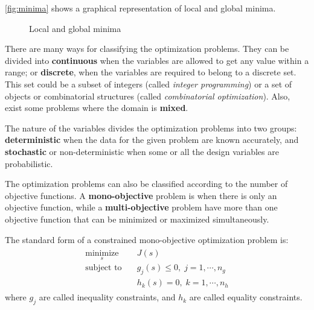 \autoref{fig:minima} shows a graphical representation of local and global minima.

\begin{figure}[H]
\caption{Local and global minima}
\label{fig:minima}
\centering
{}
\end{figure}

There are many ways for classifying the optimization problems. They can be divided into \textbf{continuous} when the variables are allowed to get any value within a range; or \textbf{discrete}, when the variables are required to belong to a discrete set. This set could be a subset of integers (called \textit{integer programming}) or a set of objects or combinatorial structures (called \textit{combinatorial optimization}). Also, exist some problems where the domain is \textbf{mixed}.

The nature of the variables divides the optimization problems into two groups: \textbf{deterministic} when the data for the given problem are known accurately, and \textbf{stochastic} or non-deterministic when some or all the design variables are probabilistic.

The optimization problems can also be classified according to the number of objective functions. A \textbf{mono-objective} problem is when there is only an objective function, while a \textbf{multi-objective} problem have more than one objective function that can be minimized or maximized simultaneously.

The standard form of a constrained mono-objective optimization problem is:
%
\begin{align}
\begin{split}
    \underset{s}{\text{minimize}} \quad &J(s) \\
    \text{subject to} \quad &g_j(s) \leq 0, \; j = 1, \cdots, n_g \\
    & h_k(s) = 0, \; k = 1, \cdots, n_h
\end{split}
\end{align}
%
where $g_j$ are called inequality constraints, and $h_k$ are called equality constraints.

